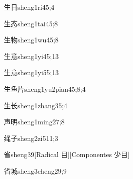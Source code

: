 \begin{verbete}{生日}{sheng1ri4}{5;4}
\end{verbete}

\begin{verbete}{生态}{sheng1tai4}{5;8}
\end{verbete}

\begin{verbete}{生物}{sheng1wu4}{5;8}
\end{verbete}

\begin{verbete}{生意}{sheng1yi4}{5;13}
\end{verbete}

\begin{verbete}{生意}{sheng1yi5}{5;13}
\end{verbete}

\begin{verbete}{生鱼片}{sheng1yu2pian4}{5;8;4}
\end{verbete}

\begin{verbete}{生长}{sheng1zhang3}{5;4}
\end{verbete}

\begin{verbete}{声明}{sheng1ming2}{7;8}
\end{verbete}

\begin{verbete}{绳子}{sheng2zi5}{11;3}
\end{verbete}

\begin{verbete}{省}{sheng3}{9}[Radical 目][Componentes 少目]
\end{verbete}

\begin{verbete}{省城}{sheng3cheng2}{9;9}
\end{verbete}

